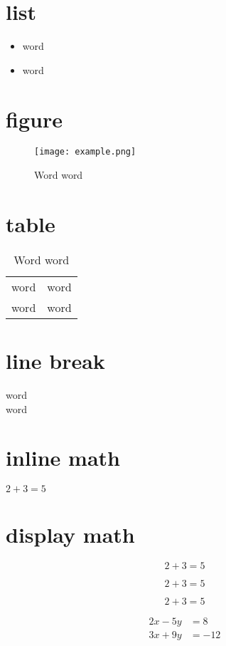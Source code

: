 \documentclass{article}
\begin{document}
\section{list}
\begin{itemize}
    \item word %
    \item word %
\end{itemize}

\section{figure}
\begin{figure}
    \texttt{[image: example.png]} %
    \caption{Word word} %
\end{figure}

\section{table}
\begin{table}
    \begin{tabular}{c|c}
       word & word \\ %
       word & word %
    \end{tabular}
    \caption{Word word} %
\end{table}

\section{line break}
word\\word %

\section{inline math}
$2+3=5$ %

\section{display math}
\[2+3=5\]

\begin{equation}
    2+3=5
\end{equation}

\begin{equation*}
    2+3=5
\end{equation*}

\begin{align*}
2x - 5y &=  8 \\
3x + 9y &=  -12
\end{align*}
\end{document}
